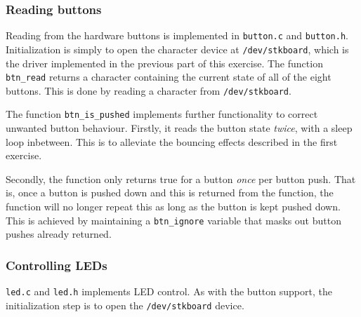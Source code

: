 \subsubsection{Reading buttons}

Reading from the hardware buttons is implemented in \texttt{button.c}
and \texttt{button.h}. Initialization is simply to open the character
device at \texttt{/dev/stkboard}, which is the driver implemented in the
previous part of this exercise. The function \texttt{btn\_read} returns
a character containing the current state of all of the eight buttons.
This is done by reading a character from \texttt{/dev/stkboard}.

The function \texttt{btn\_is\_pushed} implements further functionality to
correct unwanted button behaviour. Firstly, it reads the button state
\emph{twice}, with a sleep loop inbetween. This is to alleviate the
bouncing effects described in the first exercise.

Secondly, the function only returns true for a button \emph{once} per
button push. That is, once a button is pushed down and this is returned
from the function, the function will no longer repeat this as long as
the button is kept pushed down. This is achieved by maintaining a
\texttt{btn\_ignore} variable that masks out button pushes already
returned.

\subsubsection{Controlling LEDs}

\texttt{led.c} and \texttt{led.h} implements LED control. As with the
button support, the initialization step is to open the
\texttt{/dev/stkboard} device.
